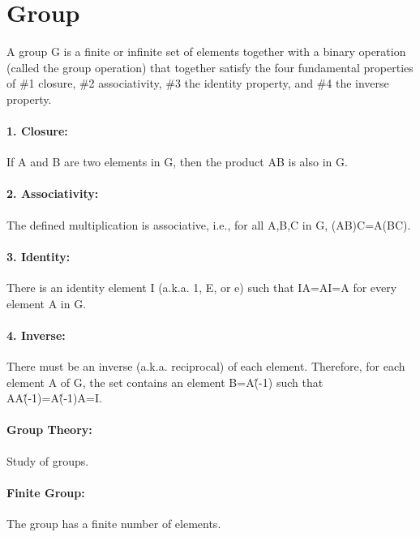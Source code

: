 \documentclass[12pt]{article}
\begin{document}
\maketitle
\pagebreak

\section{Group}

A group G is a finite or infinite set of elements together with a binary operation (called the group operation) that together satisfy the four fundamental properties of \#1 closure, \#2 associativity, \#3 the identity property, and \#4 the inverse property. 

\paragraph{1. Closure:} If A and B are two elements in G, then the product AB is also in G.

\paragraph{2. Associativity:} The defined multiplication is associative, i.e., for all A,B,C in G, (AB)C=A(BC).

\paragraph{3. Identity:} There is an identity element I (a.k.a. 1, E, or e) such that IA=AI=A for every element A in G.

\paragraph{4. Inverse:} There must be an inverse (a.k.a. reciprocal) of each element. Therefore, for each element A of G, the set contains an element B=A\^(-1) such that AA\^(-1)=A\^(-1)A=I.

\paragraph{Group Theory:} Study of groups.

\paragraph{Finite Group:} The group has a finite number of elements.
\end{document}
